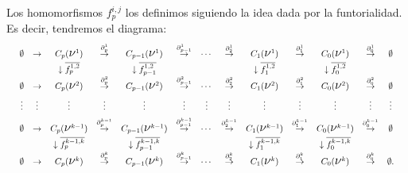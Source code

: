 \documentclass[12pt, a4paper, twoside]{book}
\numberwithin{equation}{section}
\theoremstyle{definition}
\theoremstyle{remark}
\theoremstyle{plain}
\begin{document}
	Los homomorfismos $f_{p}^{i,j}$ los definimos siguiendo la idea dada
	por la funtorialidad. Es decir, tendremos el diagrama:
	\begin{equation*}
		\resizebox{\textwidth}{!}{$ 
		\begin{array}{ccccccccccccc}
			\emptyset & \rightarrow & C_{p}(
			\text{{\Large $\nu$}$^{1}$}) & \overset{\partial_{p}^{1}}{\rightarrow} & C_{p-1}(
			\text{{\Large $\nu$}$^{1}$}) & \overset{\partial_{p-1}^{1}}{\rightarrow} &\cdots & 
			\overset{\partial_{2}^{1}}{\rightarrow} & C_{1}(
			\text{{\Large $\nu$}$^{1}$})& \overset{\partial_{1}^{1}}{\rightarrow} & C_{0}(
			\text{{\Large $\nu$}$^{1}$})& \overset{\partial_{0}^{1}}{\rightarrow} & 
			\emptyset\\[3pt]

			& & \downarrow \overline{f_{p}^{1,2}}& & 
			\downarrow \overline{f_{p-1}^{1,2}}&  
			& &  & \downarrow \overline{f_{1}^{1,2}}
			&  & \downarrow \overline{f_{0}^{1,2}} & 
			 & \\ 	
			\emptyset & \rightarrow & C_{p}(
			\text{{\Large $\nu$}$^{2}$}) & \overset{\partial_{p}^{2}}{\rightarrow} & C_{p-1}(
			\text{{\Large $\nu$}$^{2}$}) & \overset{\partial_{p-1}^{2}}{\rightarrow} &\cdots & 
			\overset{\partial_{2}^{2}}{\rightarrow} & C_{1}(
			\text{{\Large $\nu$}$^{2}$})& \overset{\partial_{1}^{2}}{\rightarrow} & C_{0}(
			\text{{\Large $\nu$}$^{2}$})& \overset{\partial_{0}^{2}}{\rightarrow} & 
			\emptyset \\[5pt]
			
			\vdots & \vdots & \vdots & \vdots & \vdots & \vdots & 
			\vdots & \vdots & \vdots & \vdots & \vdots & \vdots & 
			\vdots \\[5pt]
			
			\emptyset & \rightarrow & C_{p}(
			\text{{\Large $\nu$}$^{k-1}$}) & \overset{\partial_{p}^{k-1}}{\rightarrow} & C_{p-1}(
			\text{{\Large $\nu$}$^{k-1}$}) & \overset{\partial_{p-1}^{k-1}}{\rightarrow} &\cdots & 
			\overset{\partial_{2}^{k-1}}{\rightarrow} & C_{1}(
			\text{{\Large $\nu$}$^{k-1}$})& \overset{\partial_{1}^{k-1}}{\rightarrow} & C_{0}(
			\text{{\Large $\nu$}$^{k-1}$})& \overset{\partial_{0}^{k-1}}{\rightarrow} & 
			\emptyset\\[3pt]

			& & \downarrow \overline{f_{p}^{k-1,k}}& & 
			\downarrow \overline{f_{p-1}^{k-1,k}}&  
			& &  & \downarrow \overline{f_{1}^{k-1,k}}
			&  & \downarrow \overline{f_{0}^{k-1,k}} &  & \\

			\emptyset & \rightarrow & C_{p}(
			\text{{\Large $\nu$}$^{k}$}) & \overset{\partial_{p}^{k}}{\rightarrow} & C_{p-1}(
			\text{{\Large $\nu$}$^{k}$}) & \overset{\partial_{p-1}^{k}}{\rightarrow} &\cdots & 
			\overset{\partial_{2}^{k}}{\rightarrow} & C_{1}(
			\text{{\Large $\nu$}$^{k}$})& \overset{\partial_{1}^{k}}{\rightarrow} & C_{0}(
			\text{{\Large $\nu$}$^{k}$})& \overset{\partial_{0}^{k}}{\rightarrow} & \emptyset. \\
		\end{array}$}
	\end{equation*}
\end{document}
